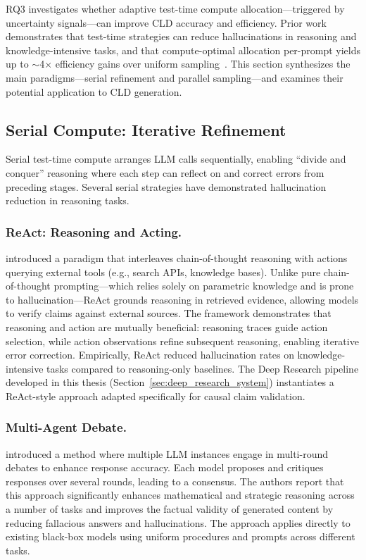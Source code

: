 RQ3 investigates whether adaptive test-time compute allocation---triggered by uncertainty signals---can improve CLD accuracy and efficiency. Prior work demonstrates that test-time strategies can reduce hallucinations in reasoning and knowledge-intensive tasks, and that compute-optimal allocation per-prompt yields up to $\sim$4$\times$ efficiency gains over uniform sampling~\citep{snell2024scalingllmtesttimecompute}. This section synthesizes the main paradigms---serial refinement and parallel sampling---and examines their potential application to CLD generation.

\subsection{Serial Compute: Iterative Refinement}

Serial test-time compute arranges LLM calls sequentially, enabling ``divide and conquer'' reasoning where each step can reflect on and correct errors from preceding stages. Several serial strategies have demonstrated hallucination reduction in reasoning tasks.

\subsubsection{ReAct: Reasoning and Acting.} \citet{yao2023react} introduced a paradigm that interleaves chain-of-thought reasoning with actions querying external tools (e.g., search APIs, knowledge bases). Unlike pure chain-of-thought prompting---which relies solely on parametric knowledge and is prone to hallucination---ReAct grounds reasoning in retrieved evidence, allowing models to verify claims against external sources. The framework demonstrates that reasoning and action are mutually beneficial: reasoning traces guide action selection, while action observations refine subsequent reasoning, enabling iterative error correction. Empirically, ReAct reduced hallucination rates on knowledge-intensive tasks compared to reasoning-only baselines. The Deep Research pipeline developed in this thesis (Section~\ref{sec:deep_research_system}) instantiates a ReAct-style approach adapted specifically for causal claim validation.

\subsubsection{Multi-Agent Debate.} \citet{du2023multiagentdebate} introduced a method where multiple LLM instances engage in multi-round debates to enhance response accuracy. Each model proposes and critiques responses over several rounds, leading to a consensus. The authors report that this approach significantly enhances mathematical and strategic reasoning across a number of tasks and improves the factual validity of generated content by reducing fallacious answers and hallucinations. The approach applies directly to existing black-box models using uniform procedures and prompts across different tasks.


